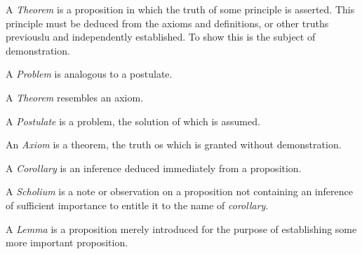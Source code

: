 \documentclass{article}
\begin{document}
A \textit{Theorem} is a proposition in which the truth of some principle is asserted. This principle must be deduced from the axioms and definitions, or other truths previouslu and independently established. To show this is the subject of demonstration. 

A \textit{Problem} is analogous to a postulate. 

A \textit{Theorem} resembles an axiom. 

A \textit{Postulate} is a problem, the solution of which is assumed. 

An \textit{Axiom} is a theorem, the truth os which is granted without demonstration. 

A \textit{Corollary} is an inference deduced immediately from a proposition. 

A \textit{Scholium} is a note or observation on a proposition not containing an inference of sufficient importance to entitle it to the name of \textit{corollary}. 

A \textit{Lemma} is a proposition merely introduced for the purpose of establishing some more important proposition. 

\newcommand{\manydots}[2][9pt]{
\begin{tikzpicture}
\foreach \x in {1,...,#2} 
\fill (\x*#1,0) circle (0.55pt);
\end{tikzpicture}
}

\newcommand{\therefore}{
\begin{tikzpicture}[scale=0.18]
\fill (0,0) circle (5pt);
\fill (1,0) circle (5pt);
\fill (60:1) circle (5pt);
\end{tikzpicture}} 

\newcommand{\because}{
\begin{tikzpicture}[scale=-0.18]
\fill (0,0) circle (5pt);
\fill (1,0) circle (5pt);
\fill (60:1) circle (5pt);
\end{tikzpicture}} 

\newcommand{\equals}{
\ensuremath{
\mathrel{
\begin{tikzpicture}[baseline=-0.5ex]
\draw[line width=1.0pt] (0,1.5pt) -- (9pt,1.5pt);
\draw[line width=1.0pt] (0,-1.5pt) -- (9pt,-1.5pt);
\end{tikzpicture}}}
}

\newcommand{\notequals}{
\ensuremath{
\mathrel{
\begin{tikzpicture}[baseline=-0.5ex]
\draw[line width=1.0pt] (0,1.5pt) -- (9pt,1.5pt);
\draw[line width=1.0pt] (0,-1.5pt) -- (9pt,-1.5pt);
\draw[line width=1.0pt] (4.5pt,-4pt) -- (4.5pt,4pt);
\end{tikzpicture}}}
}
\end{document}
